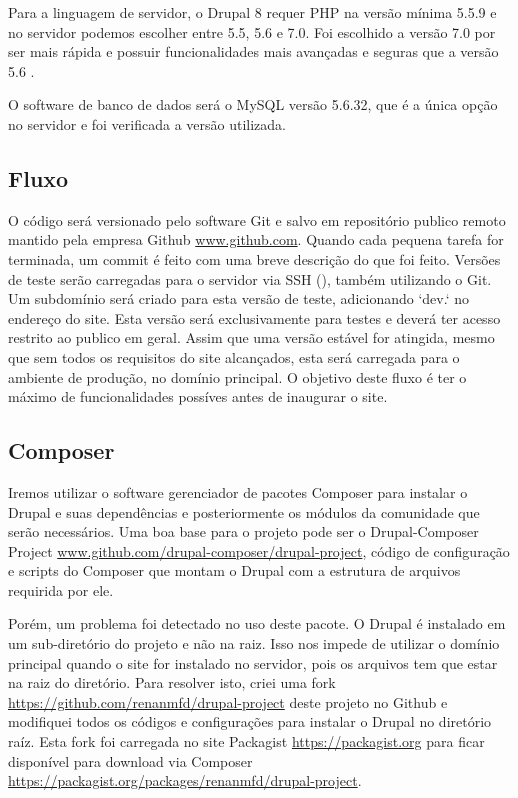 \documentclass[
	12pt,				%
    oneside,			%
	a4paper,			%
	english,			%
	french,				%
	spanish,			%
	brazil				%
	]{abntex2}
\begin{document}
Para a linguagem de servidor, o Drupal 8 requer PHP na versão mínima 5.5.9 e no servidor podemos escolher entre 5.5, 5.6 e 7.0. Foi escolhido a versão 7.0 por ser mais rápida \cite{PHP7Velocidade} e possuir funcionalidades mais avançadas e seguras que a versão 5.6 \cite{PHP7}.

O software de banco de dados será o MySQL versão 5.6.32, que é a única opção no servidor e foi verificada a versão utilizada.

\subsection{Fluxo}
O código será versionado pelo software Git e salvo em repositório publico remoto mantido pela empresa Github \url{www.github.com}. Quando cada pequena tarefa for terminada, um commit é feito com uma breve descrição do que foi feito. Versões de teste serão carregadas para o servidor via SSH (\TODO), também utilizando o Git. Um subdomínio será criado para esta versão de teste, adicionando `dev.` no endereço do site. Esta versão será exclusivamente para testes e deverá ter acesso restrito ao publico em geral. Assim que uma versão estável for atingida, mesmo que sem todos os requisitos do site alcançados, esta será carregada para o ambiente de produção, no domínio principal. O objetivo deste fluxo é ter o máximo de funcionalidades possíves antes de inaugurar o site.

\subsection{Composer}
Iremos utilizar o software gerenciador de pacotes Composer para instalar o Drupal e suas dependências e posteriormente os módulos da comunidade que serão necessários. Uma boa base para o projeto pode ser o Drupal-Composer Project \url{www.github.com/drupal-composer/drupal-project}, código de configuração e scripts do Composer que montam o Drupal com a estrutura de arquivos requirida por ele.

Porém, um problema foi detectado no uso deste pacote. O Drupal é instalado em um sub-diretório do projeto e não na raiz. Isso nos impede de utilizar o domínio principal quando o site for instalado no servidor, pois os arquivos tem que estar na raiz do diretório. Para resolver isto, criei uma fork \TODO \url{https://github.com/renanmfd/drupal-project} deste projeto no Github e modifiquei todos os códigos e configurações para instalar o Drupal no diretório raíz. Esta \TODO fork foi carregada no site Packagist \url{https://packagist.org} para ficar disponível para download via Composer \url{https://packagist.org/packages/renanmfd/drupal-project}.
\end{document}

